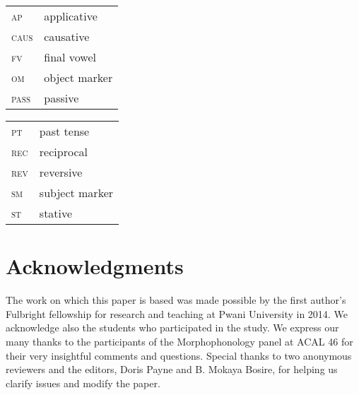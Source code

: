 \documentclass[output=paper]{langsci/langscibook}
\begin{document}
\begin{tabularx}{.45\textwidth}{lX}
\textsc{ap} & applicative  \\

\textsc{caus} &  causative  \\ 

\textsc{fv} &  final vowel \\

\textsc{om} & object marker \\ 

\textsc{pass} & passive  \\
\end{tabularx}
\begin{tabularx}{.45\textwidth}{lX}
\textsc{pt} & past tense \\

\textsc{rec} & reciprocal  \\

\textsc{rev} & reversive \\ 

\textsc{sm} & subject marker \\

\textsc{st} & stative \\
\end{tabularx}       

\section*{Acknowledgments }

The work on which this paper is based was made possible by the first author’s Fulbright fellowship for research and teaching at Pwani University in 2014. We acknowledge also the students who participated in the study. We express our many thanks to the participants of the Morphophonology panel at ACAL 46 for their very insightful comments and questions. Special thanks to two anonymous reviewers and the editors, Doris Payne and B. Mokaya Bosire, for helping us clarify issues and modify the paper. 

\printbibliography[heading=subbibliography,notkeyword=this]
\end{document}
